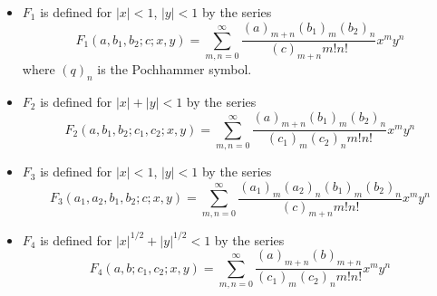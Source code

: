 \documentclass{article}
\theoremstyle{mytheoremstyle}
\theoremstyle{mytheoremstyle}
\theoremstyle{myproblemstyle}
\begin{document}
\begin{itemize}
          \begin{itemize}
            \item $F_1 $ is defined for $\lvert x  \rvert <1 $, $\lvert y  \rvert < 1 $ by the series \[
              F_1(a,b_1,b_2;c;x,y)=\displaystyle\sum_{m,n=0 }^{\infty } \displaystyle\frac{(a)_{m+n }(b_1)_{m }(b_2)_{n }}{(c)_{m+n}m!n! }x ^m y^n 
            \] 
              where $(q)_n $ is the Pochhammer symbol.
            \item $F_2 $ is defined for $\lvert x  \rvert +\lvert y  \rvert < 1 $ by the series \[
              F_2(a,b_1,b_2;c_1,c_2;x,y)=\displaystyle\sum_{m,n=0 }^{\infty } \displaystyle\frac{(a)_{m+n }(b_1)_{m }(b_2)_{n }}{(c_1)_{m}(c_2)_{n}m!n! }x ^m y^n 
            \] 
            \item $F_3 $ is defined for $\lvert x  \rvert <1 $, $\lvert y  \rvert < 1 $ by the series \[
              F_3(a_1,a_2,b_1,b_2;c;x,y)=\displaystyle\sum_{m,n=0 }^{\infty } \displaystyle\frac{(a_1)_{m}(a_2)_{n}(b_1)_{m }(b_2)_{n }}{(c)_{m+n}m!n! }x ^m y^n 
            \] 
            \item $F_4 $ is defined for $\lvert x  \rvert ^{1/2} +\lvert y  \rvert ^{1/2}< 1 $ by the series \[
              F_4(a,b;c_1,c_2;x,y)=\displaystyle\sum_{m,n=0 }^{\infty } \displaystyle\frac{(a)_{m+n }(b)_{m+n }}{(c_1)_{m}(c_2)_{n}m!n! }x ^m y^n 
            \] 
          \end{itemize}
      \end{itemize}
\end{document}
